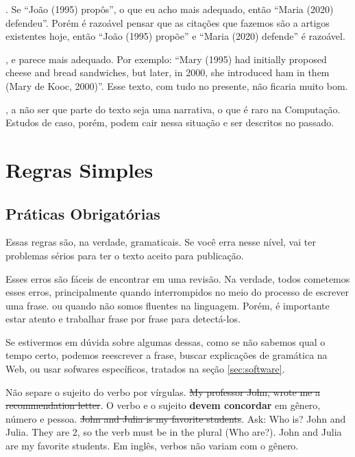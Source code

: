 \documentclass{article}
\begin{document}
. Se ``João (1995) propôs'', o que eu acho mais adequado, então ``Maria (2020) defendeu''. Porém é razoável pensar que as citações que fazemos são a artigos existentes hoje, então ``João (1995) propõe'' e ``Maria (2020) defende'' é razoável. 

, e parece mais adequado. Por exemplo: ``Mary (1995) had initially proposed cheese and bread sandwiches, but later, in 2000, she introduced ham in them (Mary de Kooc, 2000)''. Esse texto, com tudo no presente, não ficaria muito bom.



, a não ser que parte do texto seja uma narrativa, o que é raro na Computação. Estudos de caso, porém, podem cair nessa situação e ser descritos no passado.

\section{Regras Simples}

\subsection{Práticas Obrigatórias}

Essas regras são, na verdade, gramaticais. Se você erra nesse nível, vai ter problemas sérios para ter o texto aceito para publicação. 

Esses erros são fáceis de encontrar em uma revisão. Na verdade, todos cometemos esses erros, principalmente quando interrompidos no meio do processo de escrever uma frase. ou quando não somos fluentes na linguagem. Porém, é importante estar atento e trabalhar frase por frase para detectá-los.

Se estivermos em dúvida sobre algumas dessas, como se não sabemos qual o tempo certo, podemos reescrever a frase, buscar explicações de gramática na Web, ou usar sofwares específicos, tratados na seção \ref{sec:software}.

\begin{outline}
    \1 Não separe o sujeito do verbo por vírgulas.
    \2 \sout{My professor John, wrote me a recommendation letter}.
    \1 O verbo e o sujeito \textbf{devem concordar} em gênero, número e pessoa. 
    \2 \sout{John and Julia is my favorite students}.
        \3 Ask: Who is? John and Julia. They are 2, so the verb must be in the plural (Who are?).
    \2 John and Julia are my favorite students.
    \2 Em inglês, verbos não variam com o gênero.
\end{outline}
\end{document}
